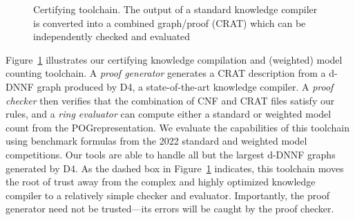 \documentclass[letterpaper,USenglish,cleveref, autoref, thm-restate]{lipics-v2021}
\newcommand{\progname}[1]{\textsc{#1}}
\newcommand{\dfour}{\progname{D4}}
\begin{document}
\begin{figure}
\caption{Certifying toolchain.
  The output of a standard knowledge compiler is converted into a combined graph/proof (CRAT)
  which can be independently checked and evaluated}
\label{fig:chain}
\end{figure}


Figure~\ref{fig:chain} illustrates our certifying knowledge compilation
and (weighted) model counting toolchain.  A
{\em proof generator} generates a CRAT description from a d-DNNF
graph produced by \dfour{}, a state-of-the-art knowledge compiler.
A {\em proof checker} then verifies that the combination of CNF and CRAT files
satisfy our rules, and a {\em ring evaluator} can compute
either a standard or weighted model count from the POG\@ representation.
We evaluate the capabilities of this toolchain using
benchmark formulas from the 2022 standard and weighted model
competitions.  Our tools are able to handle all but the largest d-DNNF
graphs generated by \dfour{}.
As the dashed box in Figure~\ref{fig:chain} indicates, this toolchain
moves the root of trust away from the complex and highly
optimized knowledge compiler to a relatively simple checker and
evaluator.  Importantly, the proof generator need not be
trusted---its errors will be caught by the proof checker.
\end{document}
